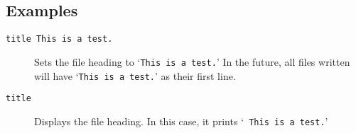 \subsection{Examples}

\begin{description}

\item[{\tt title This is a test.}] Sets the file heading to `{\tt This is a
test.}' In the future, all files written will have `{\tt This is a test.}'
as their first line.

\item[{\tt title}] Displays the file heading.  In this case, it prints `{\tt
This is a test.}'

\end{description}
